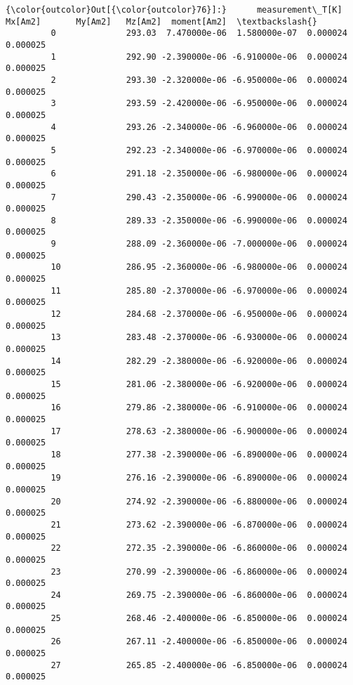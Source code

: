 \documentclass{article}
\begin{document}
            \begin{Verbatim}[commandchars=\\\{\}]
{\color{outcolor}Out[{\color{outcolor}76}]:}      measurement\_T[K]       Mx[Am2]       My[Am2]   Mz[Am2]  moment[Am2]  \textbackslash{}
         0              293.03  7.470000e-06  1.580000e-07  0.000024     0.000025   
         1              292.90 -2.390000e-06 -6.910000e-06  0.000024     0.000025   
         2              293.30 -2.320000e-06 -6.950000e-06  0.000024     0.000025   
         3              293.59 -2.420000e-06 -6.950000e-06  0.000024     0.000025   
         4              293.26 -2.340000e-06 -6.960000e-06  0.000024     0.000025   
         5              292.23 -2.340000e-06 -6.970000e-06  0.000024     0.000025   
         6              291.18 -2.350000e-06 -6.980000e-06  0.000024     0.000025   
         7              290.43 -2.350000e-06 -6.990000e-06  0.000024     0.000025   
         8              289.33 -2.350000e-06 -6.990000e-06  0.000024     0.000025   
         9              288.09 -2.360000e-06 -7.000000e-06  0.000024     0.000025   
         10             286.95 -2.360000e-06 -6.980000e-06  0.000024     0.000025   
         11             285.80 -2.370000e-06 -6.970000e-06  0.000024     0.000025   
         12             284.68 -2.370000e-06 -6.950000e-06  0.000024     0.000025   
         13             283.48 -2.370000e-06 -6.930000e-06  0.000024     0.000025   
         14             282.29 -2.380000e-06 -6.920000e-06  0.000024     0.000025   
         15             281.06 -2.380000e-06 -6.920000e-06  0.000024     0.000025   
         16             279.86 -2.380000e-06 -6.910000e-06  0.000024     0.000025   
         17             278.63 -2.380000e-06 -6.900000e-06  0.000024     0.000025   
         18             277.38 -2.390000e-06 -6.890000e-06  0.000024     0.000025   
         19             276.16 -2.390000e-06 -6.890000e-06  0.000024     0.000025   
         20             274.92 -2.390000e-06 -6.880000e-06  0.000024     0.000025   
         21             273.62 -2.390000e-06 -6.870000e-06  0.000024     0.000025   
         22             272.35 -2.390000e-06 -6.860000e-06  0.000024     0.000025   
         23             270.99 -2.390000e-06 -6.860000e-06  0.000024     0.000025   
         24             269.75 -2.390000e-06 -6.860000e-06  0.000024     0.000025   
         25             268.46 -2.400000e-06 -6.850000e-06  0.000024     0.000025   
         26             267.11 -2.400000e-06 -6.850000e-06  0.000024     0.000025   
         27             265.85 -2.400000e-06 -6.850000e-06  0.000024     0.000025   

\end{Verbatim}
\end{document}
